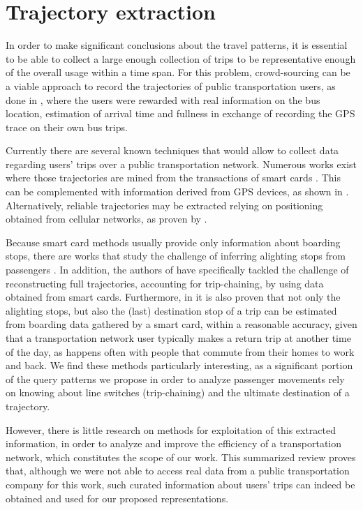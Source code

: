 \documentclass[a4paper,10pt,twoside]{book}
\begin{document}
	\section{Trajectory extraction}
	\label{sec:dm}
	In order to make significant conclusions about the travel patterns, it is essential to be able to collect a large enough collection of trips to be representative enough of the overall usage within a time span. For this problem, crowd-sourcing can be a viable approach to record the trajectories of public transportation users, as done in \cite{zimmerman2011field}, where the users were rewarded with real information on the bus location, estimation of arrival time and fullness in exchange of recording the GPS trace on their own bus trips.
	
	Currently there are several known techniques that would allow to collect data regarding users' trips over a public transportation network. Numerous works exist where those trajectories are mined from the transactions of smart cards \cite{bhaskar2015passenger,wang2014aggregated}. This can be complemented with information derived from GPS devices, as shown in \cite{ma2014development}. Alternatively, reliable trajectories may be extracted relying on positioning obtained from cellular networks, as proven by \cite{liu2017exploring}.

    Because smart card methods usually provide only information about boarding stops, there are works that study the challenge of inferring alighting stops from passengers \cite{wang2011review}. In addition, the authors of \cite{tao2014exploring} have specifically tackled the challenge of reconstructing full trajectories, accounting for trip-chaining, by using data obtained from smart cards. Furthermore, in \cite{alsger2016validating} it is also proven that not only the alighting stops, but also the (last) destination stop of a trip can be estimated from boarding data gathered by a smart card, within a reasonable accuracy, given that a transportation network user typically makes a return trip at another time of the day, as happens often with people that commute from their homes to work and back. We find these methods particularly interesting, as a significant portion of the query patterns we propose in order to analyze passenger movements rely on knowing about line switches (trip-chaining) and the ultimate destination of a trajectory.
    
    However, there is little research on methods for exploitation of this extracted information, in order to analyze and improve the efficiency of a transportation network, which constitutes the scope of our work. This summarized review proves that, although we were not able to access real data from a public transportation company for this work, such curated information about users' trips can indeed be obtained and used for our proposed representations.
	
\end{document}
